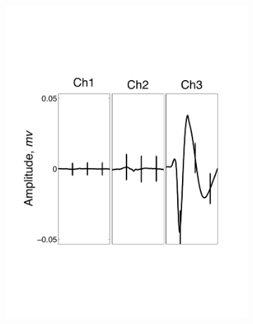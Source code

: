 \begin{center}
\begin{figure}
\begin{subfigure}[b]{.24\textwidth}
\caption{}
\label{ex31}
\end{subfigure}
\begin{subfigure}[b]{.24\textwidth}
\includegraphics[width=\textwidth]{../figs/3devim/clus2}
\caption{}
\label{ex32}
\end{subfigure}
\begin{subfigure}[b]{.24\textwidth}

\end{subfigure}
\end{figure}
\end{center}
